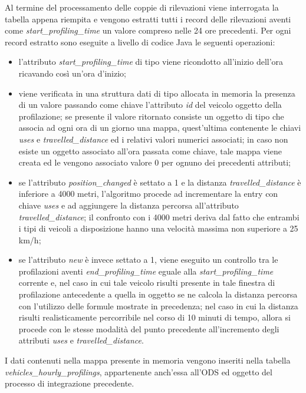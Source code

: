 Al termine del processamento delle coppie di rilevazioni viene interrogata la tabella
appena riempita e vengono estratti tutti i record delle rilevazioni aventi come
\textit{start\_profiling\_time} un valore compreso nelle 24 ore precedenti.
Per ogni record estratto sono eseguite a livello di codice Java le seguenti
operazioni:
\begin{itemize}
\item l'attributo \textit{start\_profiling\_time} di tipo  viene
ricondotto all'inizio dell'ora ricavando così un'ora d'inizio;
\item viene verificata in una struttura dati di tipo  allocata in
memoria la presenza di un valore passando come chiave l'attributo \textit{id}
del veicolo oggetto della profilazione; se presente il valore ritornato consiste un
oggetto di tipo  che associa ad ogni ora di un giorno una mappa,
quest'ultima contenente le chiavi \textit{uses} e \textit{travelled\_distance}
ed i relativi valori numerici associati; in caso non esiste un oggetto associato
all'ora passata come chiave, tale mappa viene creata ed le vengono associato
valore 0 per ognuno dei precedenti attributi;
\item se l'attributo \textit{position\_changed} è settato a 1 e la distanza
\textit{travelled\_distance} è inferiore a 4000 metri, l'algoritmo procede
ad incrementare la entry con chiave \textit{uses} e ad aggiungere la distanza
percorsa all'attributo \textit{travelled\_distance}; il confronto con i 4000
metri deriva dal fatto che entrambi i tipi di veicoli a disposizione hanno
una velocità massima non superiore a 25\,km/h;
\item se l'attributo \textit{new} è invece settato a 1, viene eseguito
un controllo tra le profilazioni aventi \textit{end\_profiling\_time} eguale
alla \textit{start\_profiling\_time} corrente e, nel caso in cui tale veicolo
risulti presente in tale finestra di profilazione antecedente a quella in oggetto
se ne calcola la distanza percorsa con l'utilizzo delle formule mostrate in
precedenza; nel caso in cui la distanza risulti realisticamente percorribile
nel corso di 10 minuti di tempo, allora si procede con le stesse modalità
del punto precedente all'incremento degli attributi \textit{uses} e
\textit{travelled\_distance}.
\end{itemize}
I dati contenuti nella mappa presente in memoria vengono inseriti nella
tabella \textit{vehicles\_hourly\_profilings}, appartenente anch'essa all'ODS
ed oggetto del processo di integrazione precedente.

